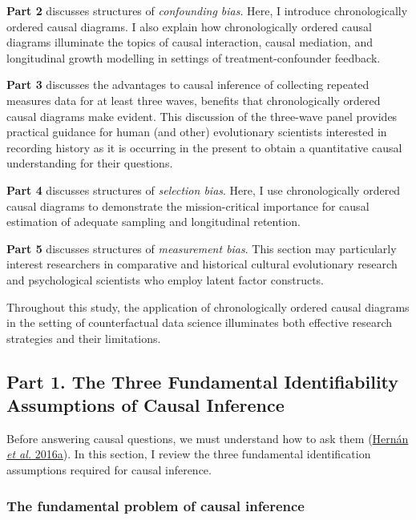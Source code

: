 \documentclass[
  singlecolumn]{article}
\begin{document}
\textbf{Part 2} discusses structures of \emph{confounding bias}. Here, I
introduce chronologically ordered causal diagrams. I also explain how
chronologically ordered causal diagrams illuminate the topics of causal
interaction, causal mediation, and longitudinal growth modelling in
settings of treatment-confounder feedback.

\textbf{Part 3} discusses the advantages to causal inference of
collecting repeated measures data for at least three waves, benefits
that chronologically ordered causal diagrams make evident. This
discussion of the three-wave panel provides practical guidance for human
(and other) evolutionary scientists interested in recording history as
it is occurring in the present to obtain a quantitative causal
understanding for their questions.

\textbf{Part 4} discusses structures of \emph{selection bias}. Here, I
use chronologically ordered causal diagrams to demonstrate the
mission-critical importance for causal estimation of adequate sampling
and longitudinal retention.

\textbf{Part 5} discusses structures of \emph{measurement bias}. This
section may particularly interest researchers in comparative and
historical cultural evolutionary research and psychological scientists
who employ latent factor constructs.

Throughout this study, the application of chronologically ordered causal
diagrams in the setting of counterfactual data science illuminates both
effective research strategies and their limitations.

\hypertarget{part-1.-the-three-fundamental-identifiability-assumptions-of-causal-inference}{%
\subsection{Part 1. The Three Fundamental Identifiability Assumptions of
Causal
Inference}\label{part-1.-the-three-fundamental-identifiability-assumptions-of-causal-inference}}

Before answering causal questions, we must understand how to ask them
(\protect\hyperlink{ref-hernuxe1n2016}{Hernán \emph{et al.} 2016a}). In
this section, I review the three fundamental identification assumptions
required for causal inference.

\hypertarget{the-fundamental-problem-of-causal-inference}{%
\subsubsection{The fundamental problem of causal
inference}\label{the-fundamental-problem-of-causal-inference}}
\end{document}

